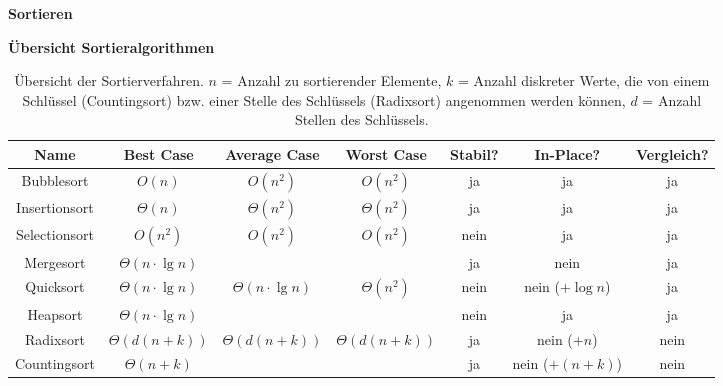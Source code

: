 \documentclass{letter}
\newcommand{\section}[1]{\medskip\bigskip

\noindent\textbf{\LARGE #1}}
\newcommand{\subsection}[1]{\medskip\bigskip

\noindent\textbf{\Large #1}}
\newcommand{\tmstrong}[1]{\textbf{#1}}
\begin{document}
\section{Sortieren}

\subsection{\"Ubersicht Sortieralgorithmen}

\begin{table}[h]
  \begin{tabular}{|c|c|c|c|c|c|c|}
    \hline
    {\tmstrong{Name}} & {\tmstrong{Best Case}} & {\tmstrong{Average Case}} &
    {\tmstrong{Worst Case}} & {\tmstrong{Stabil?}} & {\tmstrong{In-Place?}} &
    {\tmstrong{Vergleich?}}\\
    \hline
    Bubblesort & $O \left( n \right)$ & $O \left( n^2 \right)$ & $O \left( n^2
    \right)$ & ja & ja & ja\\
    \hline
    Insertionsort & $\Theta \left( n \right)$ & $\Theta \left( n^2 \right)$ &
    $\Theta \left( n^2 \right)$ & ja & ja & ja\\
    \hline
    Selectionsort & $O \left( n^2 \right)$ & $O \left( n^2 \right)$ & $O
    \left( n^2 \right)$ & nein & ja & ja\\
    \hline
    Mergesort & $\Theta \left( n \cdot \lg n \right)$ &  &  & ja & nein & ja\\
    \hline
    Quicksort & $\Theta \left( n \cdot \lg n \right)$ & $\Theta \left( n \cdot
    \lg n \right)$ & $\Theta \left( n^2 \right)$ & nein & nein ($+ \log n$) &
    ja\\
    \hline
    Heapsort & $\Theta \left( n \cdot \lg n \right)$ &  &  & nein & ja & ja\\
    \hline
    Radixsort & $\Theta \left( d \left( n + k \right) \right)$ & $\Theta
    \left( d \left( n + k \right) \right)$ & $\Theta \left( d \left( n + k
    \right) \right)$ & ja & nein ($+ n$) & nein\\
    \hline
    Countingsort & $\Theta \left( n + k \right)$ &  &  & ja & nein ($+ \left(
    n + k \right)$) & nein\\
    \hline
  \end{tabular}
  \caption{\"Ubersicht der Sortierverfahren. $n$ = Anzahl zu sortierender
  Elemente, $k$ = Anzahl diskreter Werte, die von einem Schl\"ussel
  (Countingsort) bzw. einer Stelle des Schl\"ussels (Radixsort) angenommen
  werden k\"onnen, $d$ = Anzahl Stellen des Schl\"ussels.}
\end{table}
\end{document}
